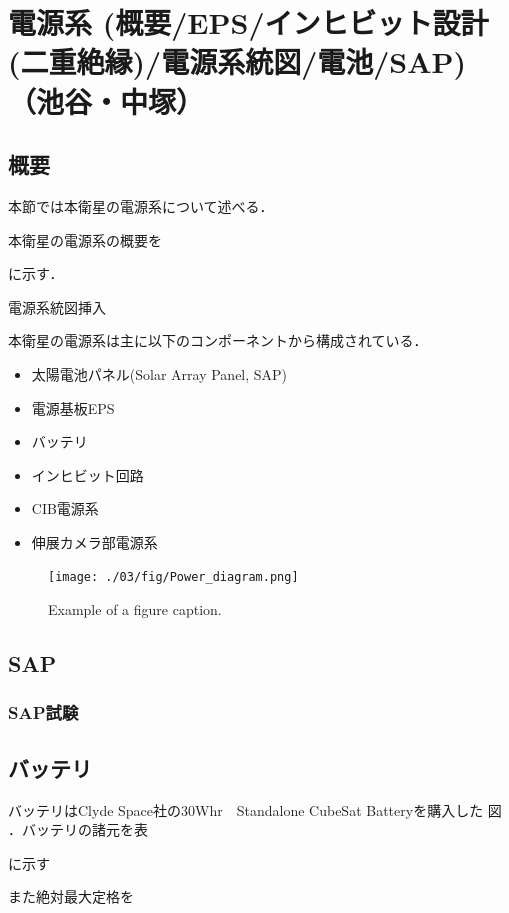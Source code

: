 \section{電源系 (概要/EPS/インヒビット設計(二重絶縁)/電源系統図/電池/SAP)（池谷・中塚）}
\subsection{概要}
本節では本衛星の電源系について述べる．

本衛星の電源系の概要を

に示す．

電源系統図挿入

本衛星の電源系は主に以下のコンポーネントから構成されている．
\begin{itemize}
	\item 太陽電池パネル(Solar Array Panel, SAP)
	\item 電源基板EPS
	\item バッテリ
	\item インヒビット回路
	\item CIB電源系
	\item 伸展カメラ部電源系
\end{itemize}


\begin{landscape}
\begin{figure}[htbp]
	\begin{center}
		\texttt{[image: ./03/fig/Power\_diagram.png]}
		\caption{Example of a figure caption.}
		\label{power_diagram}
	\end{center}
\end{figure}
\end{landscape}            


\subsection{SAP}

\subsubsection{SAP試験}

\subsection{バッテリ}
バッテリはClyde Space社の30Whr　Standalone CubeSat Batteryを購入した
図
．バッテリの諸元を表

に示す

また絶対最大定格を


